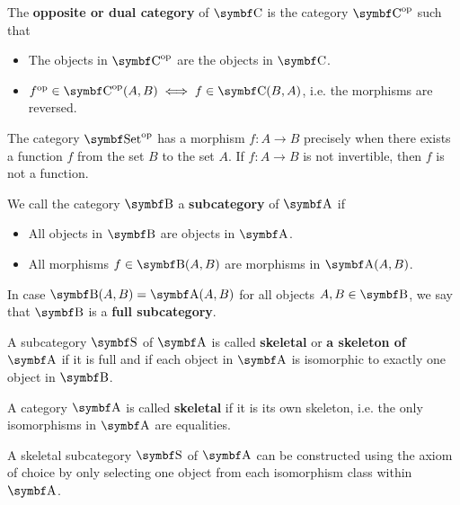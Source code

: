 \begin{definition}\label{def:opposite_category}\cite[construction 1.1.9]{Leinster2014}
  The \textbf{opposite or dual category} of \( \Bold C \) is the category \( \Bold C^{\Op} \) such that
  \begin{itemize}
    \item The objects in \( \Bold{C}^{\Op} \) are the objects in \( \Bold{C} \).
    \item \( f^{\Op} \in \Bold{C}^{\Op}(A, B) \iff f \in \Bold{C}(B, A) \), i.e. the morphisms are reversed.
  \end{itemize}
\end{definition}

\begin{example}
  The category \( \Bold{Set}^{\Op} \) has a morphism \( f: A \to B \) precisely when there exists a function \( f \) from the set \( B \) to the set \( A \). If \( f: A \to B \) is not invertible, then \( f \) is not a function.
\end{example}

\begin{definition}\label{def:subcategory}\cite[definition 1.2.18]{Leinster2014}
  We call the category \( \Bold B \) a \textbf{subcategory} of \( \Bold A \) if
  \begin{itemize}
    \item All objects in \( \Bold B \) are objects in \( \Bold A \).
    \item All morphisms \( f \in \Bold{B}(A, B) \) are morphisms in \( \Bold{A}(A, B) \).
  \end{itemize}

  In case \( \Bold{B}(A, B) = \Bold{A}(A, B) \) for all objects \( A, B \in \Bold B \), we say that \( \Bold B \) is a \textbf{full subcategory}.
\end{definition}

\begin{definition}\label{def:skeletal_category}\cite[91]{MacLane1994}
  A subcategory \( \Bold S \) of \( \Bold A \) is called \textbf{skeletal} or \textbf{a skeleton of \( \Bold A \)} if it is full and if each object in \( \Bold A \) is isomorphic to exactly one object in \( \Bold B \).

  A category \( \Bold A \) is called \textbf{skeletal} if it is its own skeleton, i.e. the only isomorphisms in \( \Bold A \) are equalities.
\end{definition}

\begin{note}\label{note:skeletal_subcategory_exists}
   A skeletal subcategory \( \Bold S \) of \( \Bold A \) can be constructed using the axiom of choice by only selecting one object from each isomorphism class within \( \Bold A \).
\end{note}

